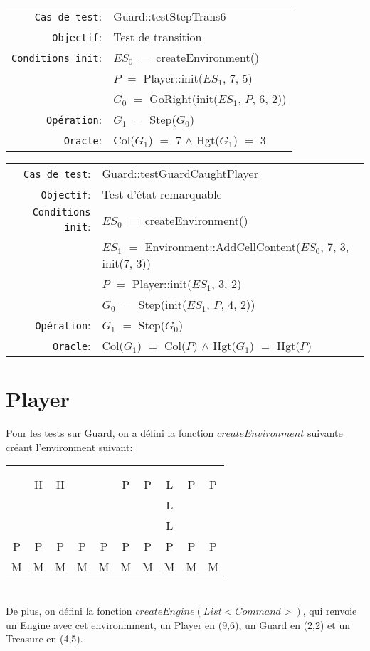 \documentclass{article}
\begin{document}
{\small
  \begin{longtable}{rl}
    \texttt{Cas de test}: &\textrm{Guard::testStepTrans6}\\
    \texttt{Objectif}: & Test de transition \\
    \texttt{Conditions init}: & $ES_0$ $=$ \textrm{createEnvironment()}\\
    & $P$ $=$ \textrm{Player::init($ES_1$, 7, 5)}\\
    & $G_0$ $=$ \textrm{GoRight(init($ES_1$, $P$, 6, 2))}\\
    \texttt{Opération}: &$G_1$ $=$ \textrm{Step($G_0$)}\\
    \texttt{Oracle}: &\textrm{Col($G_1$)} $=$ 7 $\land$ \textrm{Hgt($G_1$)} $=$ 3\\
  \end{longtable}}

{\small
  \begin{longtable}{rl}
    \texttt{Cas de test}: &\textrm{Guard::testGuardCaughtPlayer}\\
    \texttt{Objectif}: & Test d'état remarquable \\
    \texttt{Conditions init}: & $ES_0$ $=$ \textrm{createEnvironment()}\\
    & $ES_1$ $=$ \textrm{Environment::AddCellContent($ES_0$, 7, 3, init(7, 3))}\\
    & $P$ $=$ \textrm{Player::init($ES_1$, 3, 2)}\\
    & $G_0$ $=$ \textrm{Step(init($ES_1$, $P$, 4, 2))}\\
    \texttt{Opération}: &$G_1$ $=$ \textrm{Step($G_0$)}\\
    \texttt{Oracle}: &\textrm{Col($G_1$)} $=$ \textrm{Col($P$)} $\land$ \textrm{Hgt($G_1$)} $=$ \textrm{Hgt($P$)}\
  \end{longtable}}

\section{Player}

Pour les tests sur Guard, on a défini la fonction $createEnvironment$ suivante créant l'environment suivant:\\
\begin{tabular}{cccccccccc}
   & & & & & & & & & \\
   & & & & & & & & & \\
   &H&H& & &P&P&L&P&P\\
   & & & & & & &L& & \\
   & & & & & & &L& & \\
  P&P&P&P&P&P&P&P&P&P\\
  M&M&M&M&M&M&M&M&M&M
\end{tabular}\\
De plus, on défini la fonction $createEngine(List<Command>)$, qui renvoie un Engine avec cet environmment, un Player en (9,6), un Guard en (2,2) et un Treasure en (4,5).
\end{document}
